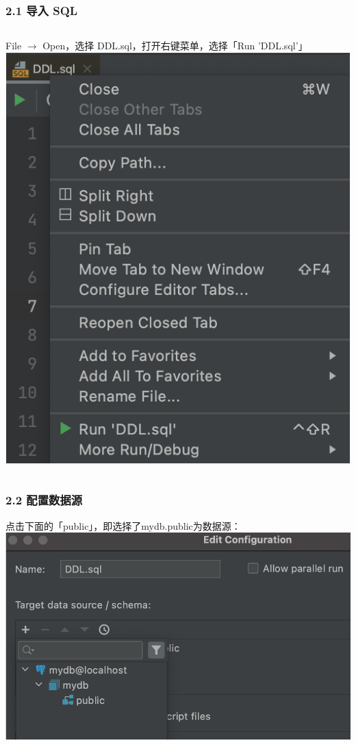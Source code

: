 \documentclass[aspectratio=169, 14pt]{beamer}
\begin{document}
\begin{frame}
    \frametitle{2.1 导入 SQL}
    \begin{columns}
        File $\rightarrow$ Open，选择 \alert{DDL.sql}，打开右键菜单，选择「Run 'DDL.sql'」
        \includegraphics[height=.9\paperheight]{week4/ddl}  
    \end{columns}

\end{frame}

\begin{frame}
    \frametitle{2.2 配置数据源}
    点击下面的「public」，即选择了mydb.public为数据源：
    \includegraphics[height=.8\paperheight]{week4/public-source}  
\end{frame}
\end{document}
